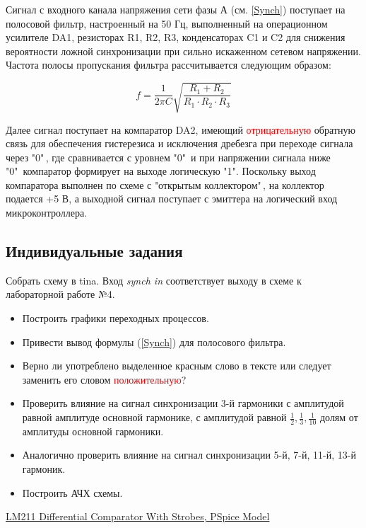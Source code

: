 Сигнал с входного канала напряжения сети фазы А (см. \ref{Synch}) поступает на полосовой фильтр, настроенный на 50 Гц, 
выполненный на операционном усилителе DA1, резисторах R1, R2, R3, конденсаторах C1 и C2 для снижения вероятности ложной синхронизации 
при сильно искаженном сетевом напряжении. Частота полосы пропускания фильтра рассчитывается следующим образом:

\begin{equation}
	f = \frac{1}{2\pi C} \sqrt{\frac{R_1+R_2}{R_1\cdot R_2 \cdot R_3}}
\label{f}
\end{equation}

 Далее сигнал поступает на компаратор DA2, имеющий \textcolor{red}{отрицательную} обратную связь для обеспечения гистерезиса и исключения дребезга 
 при переходе сигнала через "$0$"\,, где сравнивается с уровнем "0"\  и при напряжении сигнала ниже "0"\  компаратор формирует на выходе логическую "1". 
 Поскольку выход компаратора выполнен по схеме с "открытым коллектором"\,, на коллектор подается +5 В, 
 а выходной сигнал поступает с эмиттера на логический вход микроконтроллера.

\subsection{Индивидуальные задания}

Собрать схему в tina. Вход {\it synch in} соответствует выходу в схеме к лабораторной работе №4. 

\begin{itemize}
	\item Построить графики переходных процессов.

	\item Привести вывод формулы (\ref{Synch}) для полосового фильтра.

	\item Верно ли употреблено выделенное красным слово в тексте или следует заменить его словом \textcolor{red}{положительную}?

	\item Проверить влияние на сигнал синхронизации 3-й гармоники с амплитудой равной амплитуде основной гармонике, 
		с амплитудой равной $\frac{1}{2}, \frac{1}{3}, \frac{1}{10}$ долям от амплитуды основной гармоники.

	\item Аналогично проверить влияние на сигнал синхронизации 5-й, 7-й, 11-й, 13-й гармоник.

	\item Построить АЧХ схемы.
\end{itemize}
\renewcommand{\bibname}{}
\begin{thebibliography}{3} 
	 \href{https://www.ti.com/product/LM211}{LM211 Differential Comparator With Strobes, PSpice Model}
\end{thebibliography}


